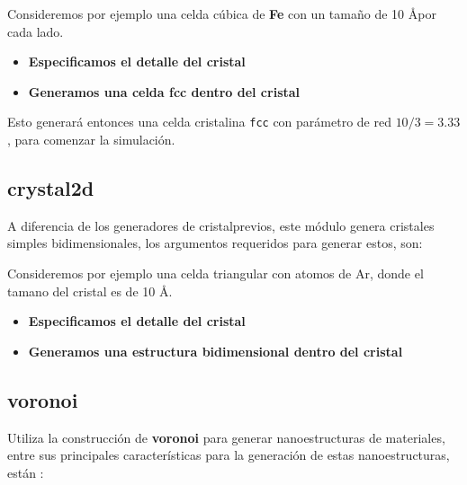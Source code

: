 Consideremos por ejemplo una celda c\'ubica de \textbf{Fe} con un tama\~no de 10
\AA por cada lado.

\begin{itemize}
 \item \textbf{Especificamos el detalle del cristal}
 \item \textbf{Generamos una celda  fcc dentro del cristal}       
\end{itemize}


Esto generar\'a entonces una celda cristalina \verb|fcc| con par\'ametro de red
$10/3 = 3.33$, para comenzar la simulaci\'on.

\subsection{crystal2d}

A diferencia de los generadores de cristalprevios, este m\'odulo genera
cristales simples bidimensionales, los argumentos requeridos para generar estos,
son:


Consideremos por ejemplo una celda triangular con atomos de Ar, donde el tamano
del cristal es de 10 \AA.

\begin{itemize}
 \item \textbf{Especificamos el detalle del cristal}
 \item \textbf{Generamos una estructura bidimensional dentro del cristal}
\end{itemize}

\subsection{voronoi}
Utiliza la construcci\'on de \textbf{voronoi} para generar nanoestructuras de
materiales, entre sus principales caracter\'isticas para la generaci\'on de
estas nanoestructuras, est\'an :

